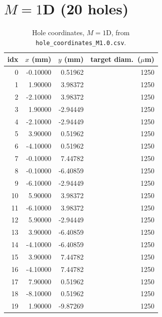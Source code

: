\section{$M=1$D (20 holes)}
\begin{longtable}{rrrr}
\caption{Hole coordinates, $M=1$D, from \texttt{hole\_coordinates\_M1.0.csv}.}\\
\toprule
idx & $x$ (mm) & $y$ (mm) & target diam.\ ($\mu$m) \\
\midrule
\endhead
0 & -0.10000 & 0.51962 & 1250 \\
1 & 1.90000 & 3.98372 & 1250 \\
2 & -2.10000 & 3.98372 & 1250 \\
3 & 1.90000 & -2.94449 & 1250 \\
4 & -2.10000 & -2.94449 & 1250 \\
5 & 3.90000 & 0.51962 & 1250 \\
6 & -4.10000 & 0.51962 & 1250 \\
7 & -0.10000 & 7.44782 & 1250 \\
8 & -0.10000 & -6.40859 & 1250 \\
9 & -6.10000 & -2.94449 & 1250 \\
10 & 5.90000 & 3.98372 & 1250 \\
11 & -6.10000 & 3.98372 & 1250 \\
12 & 5.90000 & -2.94449 & 1250 \\
13 & 3.90000 & -6.40859 & 1250 \\
14 & -4.10000 & -6.40859 & 1250 \\
15 & 3.90000 & 7.44782 & 1250 \\
16 & -4.10000 & 7.44782 & 1250 \\
17 & 7.90000 & 0.51962 & 1250 \\
18 & -8.10000 & 0.51962 & 1250 \\
19 & 1.90000 & -9.87269 & 1250 \\
\bottomrule
\end{longtable}

